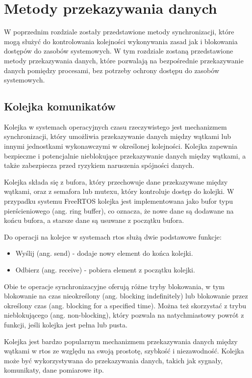 \section{Metody przekazywania danych}
W poprzednim rozdziale zostały przedstawione metody synchronizacji, które mogą służyć do kontrolowania kolejności wykonywania zasad
jak i blokowania dostępów do zasobów systemowych. W tym rozdziale zostaną przedstawione metody przekazywania danych, które pozwalają
na bezpośrednie przekazywanie danych pomiędzy procesami, bez potrzeby ochrony dostępu do zasobów systemowych.

\subsection{Kolejka komunikatów}
Kolejka w systemach operacyjnych czasu rzeczywistego jest mechanizmem synchronizacji, który umożliwia przekazywanie danych między wątkami
lub innymi jednostkami wykonawczymi w określonej kolejności\cite{freertosbook}. Kolejka zapewnia bezpieczne i potencjalnie nieblokujące przekazywanie danych między wątkami,
a także zabezpiecza przed ryzykiem naruszenia spójności danych.

Kolejka składa się z bufora, który przechowuje dane przekazywane między wątkami, oraz z semafora lub mutexu, który kontroluje dostęp do kolejki.
W przypadku systemu FreeRTOS kolejka jest implementowana jako bufor typu pierścieniowego (ang. ring buffer), co oznacza, że nowe dane są dodawane
na końcu bufora, a starsze dane są usuwane z początku bufora.

Do operacji na kolejce w systemach \gls{rtos} służą dwie podstawowe funkcje:
\begin{itemize}
    \item Wyślij (ang. send) - dodaje nowy element do końca kolejki.
    \item Odbierz (ang. receive) - pobiera element z początku kolejki.
\end{itemize}
Obie te operacje synchronizacyjne oferują różne tryby blokowania, w tym blokowanie na czas nieokreślony (ang. blocking indefinitely) lub
blokowanie przez określony czas (ang. blocking for a specified time). Można też skorzystać z trybu nieblokującego (ang. non-blocking),
który pozwala na natychmiastowy powrót z funkcji, jeśli kolejka jest pełna lub pusta.

Kolejka jest bardzo popularnym mechanizmem przekazywania danych między wątkami w \gls{rtos} ze względu na swoją prostotę,
szybkość i niezawodność. Kolejka może być wykorzystywana do przekazywania danych, takich jak sygnały, komunikaty, dane pomiarowe itp.

